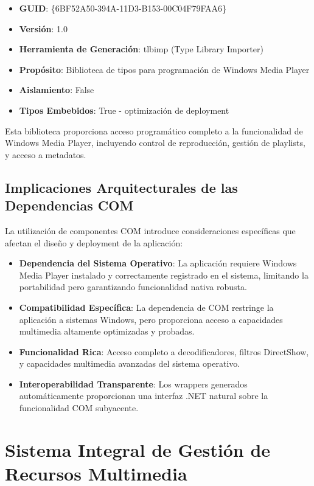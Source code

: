 \documentclass[a4paper]{article}
\begin{document}
\begin{itemize}
\item \textbf{GUID}: \{6BF52A50-394A-11D3-B153-00C04F79FAA6\}
\item \textbf{Versión}: 1.0
\item \textbf{Herramienta de Generación}: tlbimp (Type Library Importer)
\item \textbf{Propósito}: Biblioteca de tipos para programación de Windows Media Player
\item \textbf{Aislamiento}: False
\item \textbf{Tipos Embebidos}: True - optimización de deployment
\end{itemize}

Esta biblioteca proporciona acceso programático completo a la funcionalidad de Windows Media Player, incluyendo control de reproducción, gestión de playlists, y acceso a metadatos.

\subsection{Implicaciones Arquitecturales de las Dependencias COM}

La utilización de componentes COM introduce consideraciones específicas que afectan el diseño y deployment de la aplicación:

\begin{itemize}
\item \textbf{Dependencia del Sistema Operativo}: La aplicación requiere Windows Media Player instalado y correctamente registrado en el sistema, limitando la portabilidad pero garantizando funcionalidad nativa robusta.

\item \textbf{Compatibilidad Específica}: La dependencia de COM restringe la aplicación a sistemas Windows, pero proporciona acceso a capacidades multimedia altamente optimizadas y probadas.

\item \textbf{Funcionalidad Rica}: Acceso completo a decodificadores, filtros DirectShow, y capacidades multimedia avanzadas del sistema operativo.

\item \textbf{Interoperabilidad Transparente}: Los wrappers generados automáticamente proporcionan una interfaz .NET natural sobre la funcionalidad COM subyacente.
\end{itemize}

\section{Sistema Integral de Gestión de Recursos Multimedia}
\end{document}
